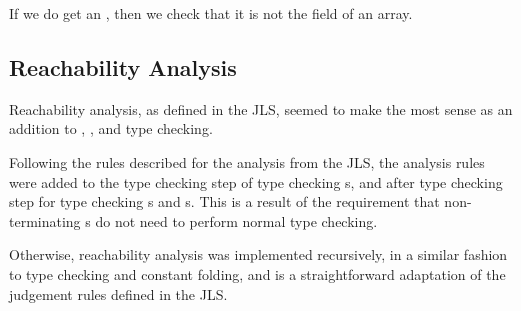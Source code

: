 \documentclass[pdftex,11pt,a4paper]{article}
\begin{document}
If we do get an , then we check that it is not the
 field of an array.


\subsection{Reachability Analysis}

Reachability analysis, as defined in the JLS, seemed to make the most
sense as an addition to , , and 
type checking.

Following the rules described for the analysis from the JLS, the
analysis rules were added to the type checking step of type checking
s, and after type checking step for type checking
s and s. This is a result of the requirement that
non-terminating s do not need to perform normal type
checking.

Otherwise, reachability analysis was implemented recursively, in a
similar fashion to type checking and constant folding, and is a
straightforward adaptation of the judgement rules defined in the JLS.
\end{document}
